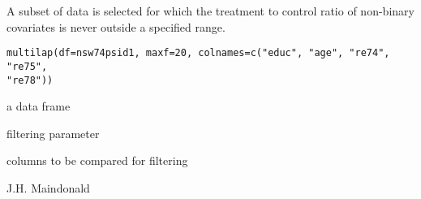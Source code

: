\begin{Description}\relax
A subset of data is selected for which the treatment to control
ratio of non-binary covariates is never outside a specified range.
\end{Description}
\begin{Usage}
\begin{verbatim}
multilap(df=nsw74psid1, maxf=20, colnames=c("educ", "age", "re74", "re75", 
"re78"))
\end{verbatim}
\end{Usage}
\begin{Arguments}
\begin{ldescription}
\item[\code{df}] a data frame
\item[\code{maxf}] filtering parameter
\item[\code{colnames}] columns to be compared for filtering
\end{ldescription}
\end{Arguments}
\begin{Author}\relax
J.H. Maindonald
\end{Author}

